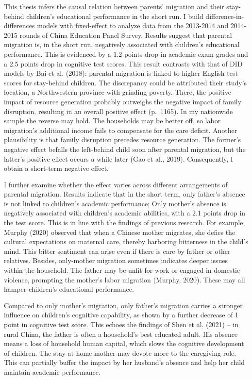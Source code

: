 \documentclass[
  man,floatsintext]{apa7}
\begin{document}
This thesis infers the causal relation between parents' migration and their stay-behind children's educational performance in the short run. I build difference-in-differences models with fixed-effect to analyze data from the 2013-2014 and 2014-2015 rounds of China Education Panel Survey. Results suggest that parental migration is, in the short run, negatively associated with children's educational performance. This is evidenced by a 1.2 points drop in academic exam grades and a 2.5 points drop in cognitive test scores. This result contrasts with that of DID models by Bai et al. (2018): parental migration is linked to higher English test scores for stay-behind children. The discrepancy could be attributed their study's location, a Northwestern province with grinding poverty. There, the positive impact of resource generation probably outweighs the negative impact of family disruption, resulting in an overall positive effect (p.~1165). In my nationwide sample the reverse may hold. The households may be better off, so labor migration's additional income fails to compensate for the care deficit. Another plausibility is that family disruption precedes resource generation. The former's negative effect befalls the left-behind child soon after parental migration, but the latter's positive effect occurs a while later (Gao et al., 2019). Consequently, I obtain a short-term negative effect.

I further examine whether the effect varies across different arrangements of parental migration. Results indicate that in the short term, only father's absence is not linked to children's academic performance; Only mother's absence is negatively associated with children's academic abilities, with a 2.1 points drop in the test score. This is in line with the findings of previous research. For example, Murphy (2020) observed that when a Chinese mother migrates, she defies the cultural expectations on maternal care, thereby harboring bitterness in the child's mind. This bitter sentiment can arise even if there is care by father or other relatives. Besides, only-mother migration sometimes indicates deeper issues within the household. The father may be unfit for work or engaged in domestic violence, prompting the mother's labor migration (Murphy, 2020). These may all hamper children's educational performance.

Compared to only mother's migration, only father's migration carries a stronger influence on children's cognitive capability, as shown by a further decrease of 1 point in cognitive test score. This echoes the findings of Shen et al. (2021) -- in rural China, the father is often a household's best educated adult. His absence means a loss of household human capital, which slows the cognitive development of children. The stay-at-home mother may devote more to the caregiving role. This can partially buffer the impact by her husband's absence and help her child maintain academic performance.
\end{document}
